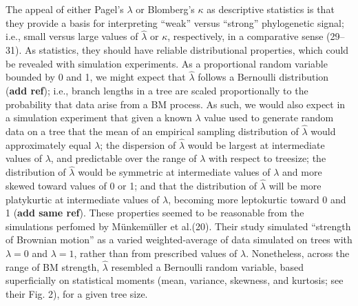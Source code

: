 \documentclass[]{article}
\begin{document}
The appeal of either Pagel's \(\lambda\) or Blomberg's \(\kappa\) as
descriptive statistics is that they provide a basis for interpreting
``weak'' versus ``strong'' phylogenetic signal; i.e., small versus large
values of \(\hat{\lambda}\) or \(\kappa\), respectively, in a
comparative sense (29--31). As statistics, they should have reliable
distributional properties, which could be revealed with simulation
experiments. As a proportional random variable bounded by 0 and 1, we
might expect that \(\hat{\lambda}\) follows a Bernoulli distribution
(\textbf{add ref}); i.e., branch lengths in a tree are scaled
proportionally to the probability that data arise from a BM process. As
such, we would also expect in a simulation experiment that given a known
\(\lambda\) value used to generate random data on a tree that the mean
of an empirical sampling distribution of \(\hat{\lambda}\) would
approximately equal \(\lambda\); the dispersion of \(\hat{\lambda}\)
would be largest at intermediate values of \(\lambda\), and predictable
over the range of \(\lambda\) with respect to treesize; the distribution
of \(\hat{\lambda}\) would be symmetric at intermediate values of
\(\lambda\) and more skewed toward values of 0 or 1; and that the
distribution of \(\hat{\lambda}\) will be more platykurtic at
intermediate values of \(\lambda\), becoming more leptokurtic toward 0
and 1 (\textbf{add same ref}). These properties seemed to be reasonable
from the simulations perfomed by Münkemüller et al.(20). Their study
simulated ``strength of Brownian motion'' as a varied weighted-average
of data simulated on trees with \(\lambda=0\) and \(\lambda=1\), rather
than from prescribed values of \(\lambda\). Nonetheless, across the
range of BM strength, \(\hat{\lambda}\) resembled a Bernoulli random
variable, based superficially on statistical moments (mean, variance,
skewness, and kurtosis; see their Fig. 2), for a given tree size.
\hfill\break
\end{document}
